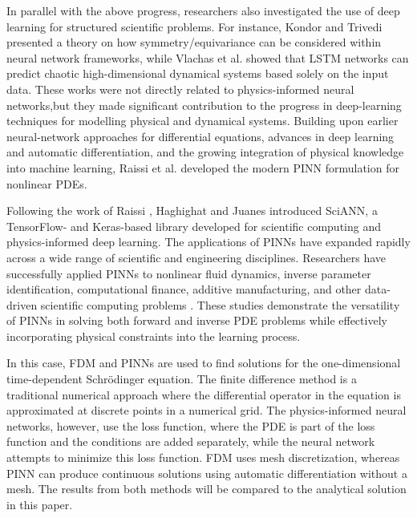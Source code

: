 \documentclass[11pt]{article}
\begin{document}
In parallel with the above progress, researchers also investigated the use of deep learning for structured scientific problems. For instance, Kondor and Trivedi \cite{kondorGeneralizationEquivarianceConvolution} presented a theory on how symmetry/equivariance can be considered within neural network frameworks, while Vlachas et al. \cite{vlachasDatadrivenForecastingHighdimensional2018} showed that LSTM networks can predict chaotic high-dimensional dynamical systems based solely on the input data. These works were not directly related to physics-informed neural networks,but they made significant contribution to the progress in deep-learning techniques for modelling physical and dynamical systems. Building upon earlier neural-network approaches for differential equations, advances in deep learning and automatic differentiation, and the growing integration of physical knowledge into machine learning, Raissi et al. \cite{raissiPhysicsinformedNeuralNetworks2019} developed the modern PINN formulation for nonlinear PDEs.

Following the work of Raissi , Haghighat and Juanes \cite{haghighatSciANNKerasTensorflow2021} introduced SciANN, a TensorFlow- and Keras-based library developed for scientific computing and physics-informed deep learning. The applications of PINNs have expanded rapidly across a wide range of scientific and engineering disciplines. Researchers have successfully applied PINNs to nonlinear fluid dynamics, inverse parameter 
identification, computational finance, additive manufacturing, and other data-driven scientific computing problems \cite{zhuMachineLearningMetal2020,xuExploreMissingFlow2021,taniosPhysicsInformedNeural2021,savovicComparativeStudyExplicit2023a}. These studies demonstrate the versatility of PINNs in solving both forward and inverse PDE problems while effectively incorporating physical constraints into the learning process.

In this case, FDM and PINNs are used to find solutions for the one-dimensional time-dependent Schrödinger equation. The finite difference method is a traditional numerical approach where the differential operator in the equation is approximated at discrete points in a numerical grid. The physics-informed neural networks, however, use the loss function, where the PDE is part of the loss function and the conditions are added separately, while the neural network attempts to minimize this loss function. FDM uses mesh discretization, whereas PINN can produce continuous solutions using automatic differentiation without a mesh. The results from both methods will be compared to the analytical solution in this paper.
\end{document}
